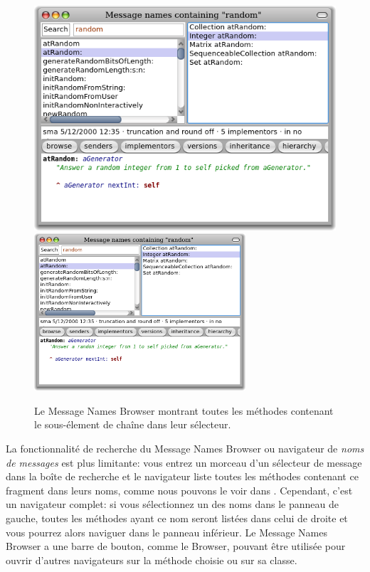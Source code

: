 \documentclass[a4paper,10pt,twoside]{book}
\begin{document}
\begin{figure}[btp]
	\begin{center}
	\ifluluelse
		{\includegraphics[width=\textwidth]{methodNamesRandom}}
		{\includegraphics[width=0.7\textwidth]{methodNamesRandom}}
	\end{center}
	\caption{Le Message Names Browser montrant toutes les méthodes
      contenant le sous-élement de chaîne  dans leur
      sélecteur.} %
\end{figure}


La fonctionnalité de recherche du Message Names Browser ou navigateur de 
\emph{noms de messages} est plus limitante: vous entrez un morceau d'un sélecteur de 
message dans la boîte de recherche et le navigateur liste toutes les méthodes
contenant ce fragment dans leurs noms, comme nous pouvons le voir dans
.
Cependant, c'est un navigateur complet:
si vous sélectionnez un des noms dans le panneau de gauche, toutes les méthodes
ayant ce nom seront listées dans celui de droite et vous pourrez alors naviguer dans
le panneau inférieur.
Le Message Names Browser a une barre de bouton, comme le Browser, %
pouvant être utilisée pour ouvrir d'autres navigateurs sur la méthode choisie
ou sur sa classe.
\end{document}
